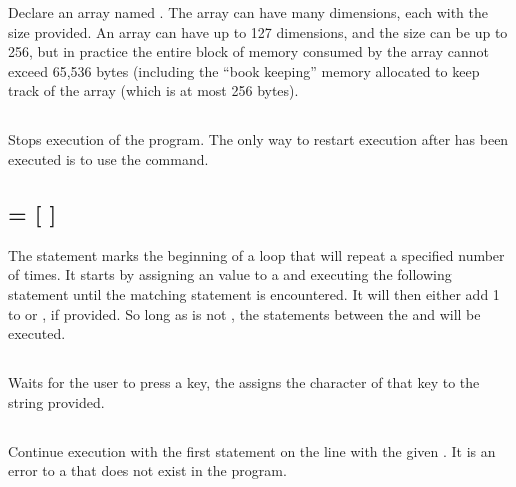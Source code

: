 \documentclass{report}
\begin{document}
    Declare an array named .
    The array can have many dimensions, each with the size provided.
    An array can have up to 127 dimensions, and the size can be up to 256, but in practice the entire block of memory
    consumed by the array cannot exceed 65,536 bytes (including the ``book keeping'' memory allocated to keep track of the array
    (which is at most 256 bytes).

    \subsection*{}

    Stops execution of the program. The only way to restart execution after  has been
    executed is to use the  command.

    \subsection*{  =    [ ]}

    The  statement marks the beginning of a loop that will repeat a specified number of times.
    It starts by assigning an  value to a  and executing the following statement until
    the matching  statement is encountered. It will then either add 1 to  or
    , if provided. So long as  is not , the statements between the
     and  will be executed.

    \subsection*{ }

    Waits for the user to press a key, the assigns the character of that key to the string  provided.

    \subsection*{ }

    Continue execution with the first statement on the line with the given .
    It is an error to  a  that does not exist in the program.
\end{document}
